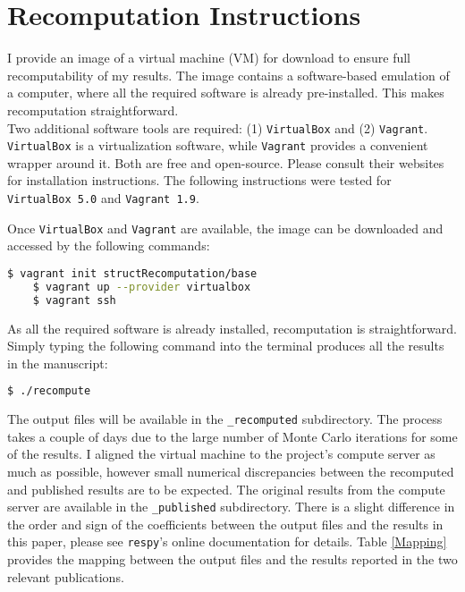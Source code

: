 \section{Recomputation Instructions}
I provide an image of a virtual machine (VM) for download to ensure full recomputability of my results. The image contains a software-based emulation of a computer, where all the required software is already pre-installed. This makes recomputation straightforward.\\\newline
%
Two additional software tools are required: (1)  \texttt{VirtualBox} and (2) \texttt{Vagrant}. \texttt{VirtualBox} is a virtualization software, while \texttt{Vagrant} provides a convenient wrapper around it. Both are free and open-source. Please consult their websites for installation instructions. The following instructions were tested for \texttt{VirtualBox 5.0} and \texttt{Vagrant 1.9}.\newline

Once \texttt{VirtualBox} and \texttt{Vagrant} are available, the image can be downloaded and accessed by the following commands:

\vspace{0.2cm}\begin{lstlisting}[language=bash]
    $ vagrant init structRecomputation/base
    $ vagrant up --provider virtualbox
    $ vagrant ssh
\end{lstlisting}\vspace{0.2cm}

As all the required software is already installed, recomputation is straightforward. Simply typing the following command into the terminal produces all the results in the manuscript:
\vspace{0.2cm}\begin{lstlisting}[language=bash]
    $ ./recompute
\end{lstlisting}\vspace{0.2cm}

The output files will be available in the \verb+_recomputed+ subdirectory. The process takes a couple of days due to the large number of Monte Carlo iterations for some of the results. I aligned the virtual machine to the project's compute server as much as possible, however small numerical discrepancies between the recomputed and published results are to be expected. The original results from the compute server are available in the \verb+_published+ subdirectory. There is a slight difference in the order and sign of the coefficients between the output files and the results in this paper, please see  \verb+respy+'s online documentation for details. Table \ref{Mapping} provides the mapping between the output files and the results reported in the two relevant publications.


